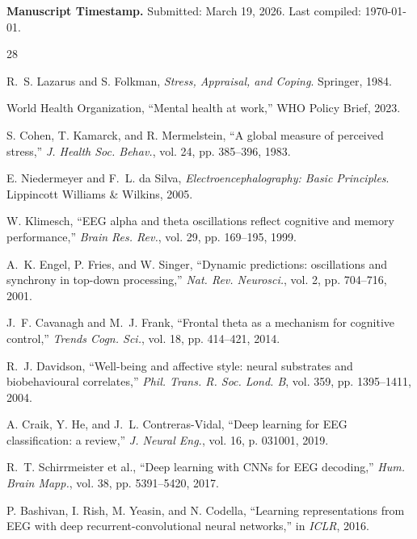 \documentclass[journal,twoside]{IEEEtran}
\begin{document}
\noindent\textbf{Manuscript Timestamp.} Submitted: March 19, 2026. Last compiled: \today.

\begin{thebibliography}{28}

R.~S. Lazarus and S. Folkman, \textit{Stress, Appraisal, and Coping}. Springer, 1984.

World Health Organization, ``Mental health at work,'' WHO Policy Brief, 2023.

S. Cohen, T. Kamarck, and R. Mermelstein, ``A global measure of perceived stress,'' \textit{J. Health Soc. Behav.}, vol. 24, pp. 385--396, 1983.

E. Niedermeyer and F.~L. da Silva, \textit{Electroencephalography: Basic Principles}. Lippincott Williams \& Wilkins, 2005.

W. Klimesch, ``EEG alpha and theta oscillations reflect cognitive and memory performance,'' \textit{Brain Res. Rev.}, vol. 29, pp. 169--195, 1999.

A.~K. Engel, P. Fries, and W. Singer, ``Dynamic predictions: oscillations and synchrony in top-down processing,'' \textit{Nat. Rev. Neurosci.}, vol. 2, pp. 704--716, 2001.

J.~F. Cavanagh and M.~J. Frank, ``Frontal theta as a mechanism for cognitive control,'' \textit{Trends Cogn. Sci.}, vol. 18, pp. 414--421, 2014.

R.~J. Davidson, ``Well-being and affective style: neural substrates and biobehavioural correlates,'' \textit{Phil. Trans. R. Soc. Lond. B}, vol. 359, pp. 1395--1411, 2004.

A. Craik, Y. He, and J.~L. Contreras-Vidal, ``Deep learning for EEG classification: a review,'' \textit{J. Neural Eng.}, vol. 16, p. 031001, 2019.

R.~T. Schirrmeister et al., ``Deep learning with CNNs for EEG decoding,'' \textit{Hum. Brain Mapp.}, vol. 38, pp. 5391--5420, 2017.

P. Bashivan, I. Rish, M. Yeasin, and N. Codella, ``Learning representations from EEG with deep recurrent-convolutional neural networks,'' in \textit{ICLR}, 2016.


\end{thebibliography}
\end{document}
